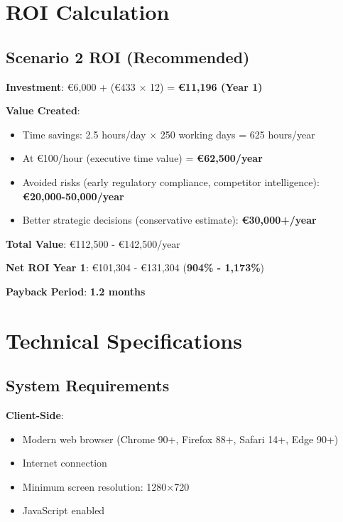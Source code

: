 \documentclass[11pt,a4paper]{article}
\begin{document}
\section{ROI Calculation}

\subsection{Scenario 2 ROI (Recommended)}

\textbf{Investment}: \euro 6,000 + (\euro 433 × 12) = \textbf{\euro 11,196 (Year 1)}

\textbf{Value Created}:
\begin{itemize}[leftmargin=*]
    \item Time savings: 2.5 hours/day × 250 working days = 625 hours/year
    \item At \euro 100/hour (executive time value) = \textbf{\euro 62,500/year}
    \item Avoided risks (early regulatory compliance, competitor intelligence): \textbf{\euro 20,000-50,000/year}
    \item Better strategic decisions (conservative estimate): \textbf{\euro 30,000+/year}
\end{itemize}

\textbf{Total Value}: \euro 112,500 - \euro 142,500/year

\textbf{Net ROI Year 1}: \euro 101,304 - \euro 131,304 (\textbf{904\% - 1,173\%})

\textbf{Payback Period}: \textbf{1.2 months}

\section{Technical Specifications}

\subsection{System Requirements}

\textbf{Client-Side}:
\begin{itemize}[leftmargin=*]
    \item Modern web browser (Chrome 90+, Firefox 88+, Safari 14+, Edge 90+)
    \item Internet connection
    \item Minimum screen resolution: 1280×720
    \item JavaScript enabled
\end{itemize}
\end{document}
